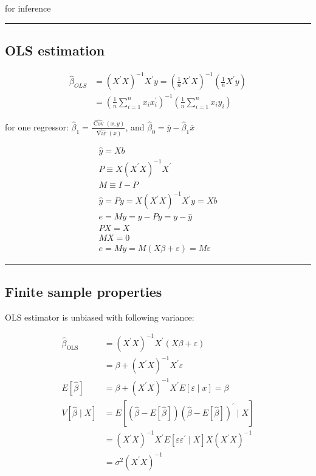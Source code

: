 for inference

\hrule

\subsection{OLS estimation}

\begin{align*}
    \widehat{\beta}_{O L S}&=\left(X^{\prime} X\right)^{-1} X^{\prime} y=\left(\frac{1}{n} X^{\prime} X\right)^{-1}\left(\frac{1}{n} X^{\prime} y\right)\\
    &=\left(\frac{1}{n} \sum_{i=1}^n x_i x_i^{\prime}\right)^{-1}\left(\frac{1}{n} \sum_{i=1}^n x_i y_i\right)
\end{align*}

for one regressor: $\widehat{\beta}_1=\frac{\widehat{\operatorname{Cov}}(x,y)}{\widehat{\operatorname{Var}}(x)}$, and $\widehat{\beta}_0 = \bar{y} - \widehat{\beta}_1 \bar{x}$

\begin{align*}
    \hat{y}=X b \\
    P \equiv X\left(X^{\prime} X\right)^{-1} X^{\prime} \\
    M \equiv I-P \\
    \hat{y}=P y=X\left(X^{\prime} X\right)^{-1} X^{\prime} y=X b \\
    e=M y=y-P y=y-\hat{y} \\
    P X=X \\
    M X=0 \\
    e=M y=M(X \beta+\varepsilon)=M \varepsilon
\end{align*}

\hrule

\subsection{Finite sample properties}

OLS estimator is unbiased with following variance:

\begin{align*}
    \widehat{\beta}_{\text{OLS}}&=\left(X^{\prime} X\right)^{-1} X^{\prime}(X \beta+\varepsilon)\\
    &=\beta+\left(X^{\prime} X\right)^{-1} X^{\prime} \varepsilon\\
    E[\hat{\beta}]&=\beta+\left(X^{\prime} X\right)^{-1} X^{\prime} E[\varepsilon \mid x]=\beta \\
    V[\hat{\beta} \mid X]&=E\left[(\hat{\beta}-E[\hat{\beta}])(\hat{\beta}-E[\hat{\beta}])^{\prime} \mid X\right] \\
    &= \left(X^{\prime} X\right)^{-1} X^{\prime} E\left[\varepsilon \varepsilon^{\prime} \mid X\right] X\left(X^{\prime} X\right)^{-1} \\
    &=\sigma^2\left(X^{\prime} X\right)^{-1}
\end{align*}

